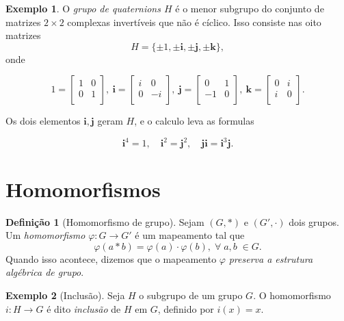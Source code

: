 \documentclass[a4paper,12pt]{report}
\theoremstyle{plain}
\theoremstyle{definition}
\newtheorem{definicao}{Definição}[section]
\newtheorem{exemplo}{Exemplo}[section]
\begin{document}
\begin{exemplo}
	O \emph{grupo de quaternions \(H\)} é o menor subgrupo
	do conjunto de matrizes \(2\times 2\) complexas invertíveis que não é
	cíclico. Isso consiste nas oito matrizes
	\[H = \{\pm 1, \pm \mathbf{i}, \pm \mathbf{j}, \pm \mathbf{k}\},\] onde
	
	\[
	1=
	\begin{bmatrix}
		1 & 0 \\
		0 & 1 \\
	\end{bmatrix},
	\ \mathbf{i}=
	\begin{bmatrix}
		i & 0 \\
		0 & -i \\
	\end{bmatrix},
	\ \mathbf{j}=
	\begin{bmatrix}
		0 & 1 \\
		-1 & 0 \\
	\end{bmatrix},
	\ \mathbf{k}=
	\begin{bmatrix}
		0 & i \\
		i & 0 \\
	\end{bmatrix}.
	\]
	
	Os dois elementos \(\mathbf{i}, \mathbf{j}\) geram \(H\), e o calculo
	leva as formulas
	
	\[\mathbf{i}^4 = 1, \quad \mathbf{i}^2 = \mathbf{j}^2, \quad \mathbf{j}\mathbf{i} = \mathbf{i}^3\mathbf{j}.\]
\end{exemplo}

\section{Homomorfismos}

\begin{definicao}[Homomorfismo de grupo]
	Sejam \((G,*)\) e \((G',\cdot)\) dois grupos. Um \emph{homomorfismo} \(\varphi: G\longrightarrow G'\) é um mapeamento tal que
	\begin{equation}\tag{propriedade de homomorfismo}
		\varphi(a*b) = \varphi(a)\cdot\varphi(b), \; \forall \; a,b\; \in G.
	\end{equation}
	Quando isso acontece, dizemos que o mapeamento $\varphi$ \emph{preserva a estrutura algébrica de grupo}.

\end{definicao}

\begin{exemplo}[Inclusão]
	Seja \(H\) o subgrupo de um grupo \(G\). O homomorfismo \(i: H \longrightarrow G\) é dito \emph{inclusão} de \(H\) em \(G\), definido por \(i(x) = x\).
\end{exemplo}
\end{document}
